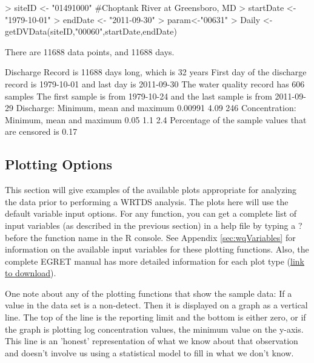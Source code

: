\documentclass[a4paper,11pt]{article}
\begin{document}
\begin{Schunk}
\begin{Sinput}
> siteID <- "01491000" #Choptank River at Greensboro, MD
> startDate <- "1979-10-01"
> endDate <- "2011-09-30"
> param<-"00631"
> Daily <- getDVData(siteID,"00060",startDate,endDate)
\end{Sinput}
\begin{Soutput}
There are  11688 data points, and  11688 days.
\end{Soutput}
\begin{Soutput}
 Discharge Record is 11688 days long, which is 32 years
 First day of the discharge record is 1979-10-01 and last day is 2011-09-30
 The water quality record has 606 samples
 The first sample is from 1979-10-24 and the last sample is from 2011-09-29
 Discharge: Minimum, mean and maximum 0.00991 4.09 246
 Concentration: Minimum, mean and maximum 0.05 1.1 2.4
 Percentage of the sample values that are censored is 0.17 %
\end{Soutput}
\end{Schunk}

\subsection{Plotting Options}
\label{sec:plotOptionsWQ}
This section will give examples of the available plots appropriate for analyzing the data prior to performing a WRTDS analysis. The plots here will use the default variable input options.  For any function, you can get a complete list of input variables (as described in the previous section) in a help file by typing a ? before the function name in the R console. See Appendix \ref{sec:wqVariables} for information on the available input variables for these plotting functions. Also, the complete EGRET manual has more detailed information for each plot type (\href{https://github.com/USGS-R/EGRET/raw/Documentation/EGRET%2Bmanual_4.doc}{link to download}).

One note about any of the plotting functions that show the sample data:  If a value in the data set is a non-detect. Then it is displayed on a graph as a vertical line.  The top of the line is the reporting limit and the bottom is either zero, or if the graph is plotting log concentration values, the minimum value on the y-axis.  This line is an 'honest' representation of what we know about that observation and doesn't involve us using a statistical model to fill in what we don't know. 
\end{document}
